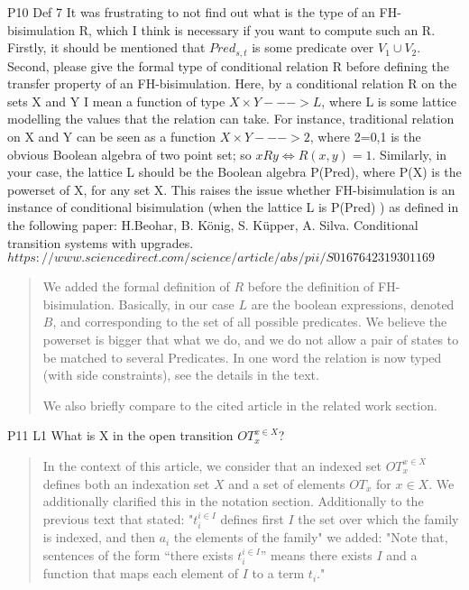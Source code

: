 \documentclass{article}
\begin{document}
P10 Def 7 It was frustrating to not find out what is the type of an FH-bisimulation R, which I think is necessary if you want to compute such an R. Firstly, it should be mentioned that $Pred_{s,t}$ is some predicate over $V_1 \cup V_2$. Second, please give the formal type of conditional relation R before defining the transfer property of an FH-bisimulation. Here, by a conditional relation R on the sets X and Y I mean a function of type $X \times Y ---> L$, where L is some lattice modelling the values that the relation can take. For instance, traditional relation on X and Y can be seen as a function $X \times Y ---> 2$, where 2={0,1} is the obvious Boolean algebra of two point set; so $x R y \iff R(x,y)=1$. Similarly, in your case, the lattice L should be the Boolean algebra P(Pred), where P(X) is the powerset of X, for any set X.
This raises the issue whether FH-bisimulation is an instance of conditional bisimulation (when the lattice L is P(Pred) ) as defined in the following paper:
H.Beohar, B. König, S. Küpper,  A. Silva. Conditional transition systems with upgrades. $https://www.sciencedirect.com/science/article/abs/pii/S0167642319301169$

\begin{quote}
We added the formal definition of $R$  before the definition of FH-bisimulation. Basically, in our case $L$ are the boolean expressions, denoted $B$, and corresponding to the set of all possible predicates. We believe the powerset is bigger that what we do, and we do not allow a pair of states to be matched to several Predicates. In one word the relation is now typed (with side constraints), see the details in the text.

We also briefly compare to the cited article in the related work section.

\end{quote}

P11 L1 What is X in the open transition $OT_x^{x\in X}$?
\begin{quote}
In the context of this article, we consider that an indexed set $OT_x^{x\in X}$ defines both an indexation set $X$ and a set of elements $OT_x$ for $x\in X$. We additionally clarified this in the notation section. Additionally to the previous text that stated:
"$t_i^{i\in I}$ defines first $I$ the set over which the family is indexed, and then $a_i$ the elements of the family"
we added:
"Note that, sentences of the form ``there exists $t_i^{i\in I}$'' means there exists $I$ and a function that maps each element of $I$ to a term $t_i$."
\end{quote}
\end{document}
